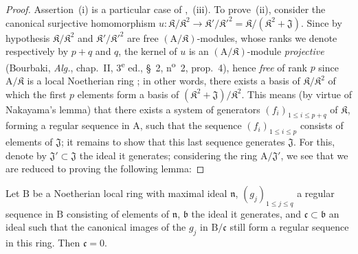 \begin{proof}
Assertion~(i) is a particular case of ,~(iii).
To prove~(ii), consider the canonical surjective homomorphism $u:\mathfrak K/\mathfrak K^2\to\mathfrak K'/\mathfrak K'^2=\mathfrak K/(\mathfrak K^2+\mathfrak{J})$.
Since by hypothesis $\mathfrak K/\mathfrak K^2$ and $\mathfrak K'/\mathfrak K'^2$ are free $(\mathrm{A}/\mathfrak K)$-modules, whose ranks we denote respectively by $p+q$ and $q$, the kernel of $u$ is an $(\mathrm{A}/\mathfrak K)$-module \emph{projective} (Bourbaki, \emph{Alg.}, chap.~II, 3\textsuperscript{e} ed., \S~2, n\textsuperscript{o}~2, prop.~4), hence \emph{free} of rank $p$ since $\mathrm{A}/\mathfrak K$ is a local Noetherian ring ; in other words, there exists a basis of $\mathfrak K/\mathfrak K^2$ of which the first $p$ elements form a basis of $(\mathfrak K^2+\mathfrak{J})/\mathfrak K^2$.
This means (by virtue of Nakayama's lemma) that there exists a system of generators $(f_i)_{1\leq i\leq p+q}$ of $\mathfrak K$, forming a regular sequence in $\mathrm{A}$, such that the sequence $(f_i)_{1\leq i\leq p}$ consists of elements of $\mathfrak{J}$; it remains to show that this last sequence generates $\mathfrak{J}$.
For this, denote by $\mathfrak{J}'\subset\mathfrak{J}$ the ideal it generates; considering the ring $\mathrm{A}/\mathfrak{J}'$, we see that we are reduced to proving the following lemma:
\end{proof}

\begin{lemma}[19.1.6.1]
\label{IV.19.1.6.1}
Let $\mathrm{B}$ be a Noetherian local ring with maximal ideal $\mathfrak{n}$, $(g_j)_{1\leq j\leq q}$ a regular sequence in $\mathrm{B}$ consisting of elements of $\mathfrak{n}$, $\mathfrak{b}$ the ideal it generates, and $\mathfrak{c}\subset\mathfrak{b}$ an ideal such that the canonical images of the $g_j$ in $\mathrm{B}/\mathfrak{c}$ still form a regular sequence in this ring.
Then $\mathfrak{c}=0$.
\end{lemma}

